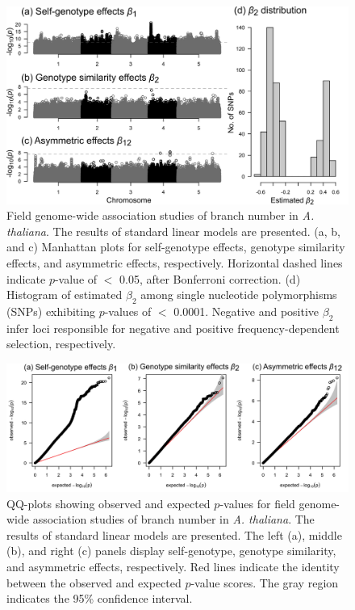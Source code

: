 \documentclass[12pt,]{article}
\begin{document}
\begin{figure}[]
  \includegraphics[width=\linewidth]{FigS9_ManhattanPlotLM.png}
  \caption{Field genome-wide association studies of branch number in \textit{A. thaliana}. The results of standard linear models are presented. (a, b, and c) Manhattan plots for self-genotype effects, genotype similarity effects, and asymmetric effects, respectively. Horizontal dashed lines indicate $p$-value of $<$ 0.05, after Bonferroni correction. (d) Histogram of estimated $\beta_2$ among single nucleotide polymorphisms (SNPs) exhibiting $p$-values of $<$ 0.0001. Negative and positive $\beta_2$ infer loci responsible for negative and positive frequency-dependent selection, respectively.}
  \label{figS10:gwasLM}
\end{figure}


\begin{figure}[]
  \includegraphics[width=\linewidth]{FigS10_QQplotLM.png}
  \caption{QQ-plots showing observed and expected $p$-values for field genome-wide association studies of branch number in \textit{A. thaliana}. The results of standard linear models are presented. The left (a), middle (b), and right (c) panels display self-genotype, genotype similarity, and asymmetric effects, respectively. Red lines indicate the identity between the observed and expected $p$-value scores. The gray region indicates the 95\% confidence interval.}
  \label{figS11:QQplotLM}
\end{figure}
\end{document}
